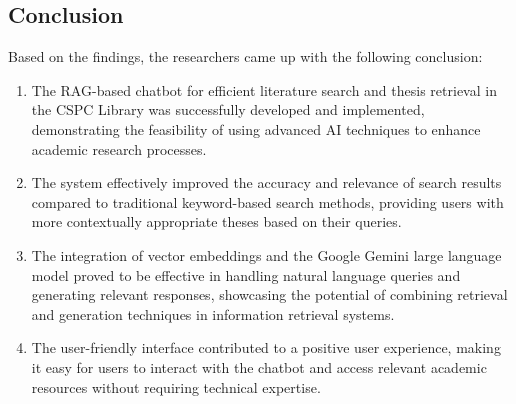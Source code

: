 \begin{refsection}
\section{Conclusion}
Based on the findings, the researchers came up with the following conclusion:
\begin{enumerate}
    \item The RAG-based chatbot for efficient literature search and thesis retrieval in the CSPC Library was successfully developed and implemented, demonstrating the feasibility of using advanced AI techniques to enhance academic research processes.
    \item The system effectively improved the accuracy and relevance of search results compared to traditional keyword-based search methods, providing users with more contextually appropriate theses based on their queries.
    \item The integration of vector embeddings and the Google Gemini large language model proved to be effective in handling natural language queries and generating relevant responses, showcasing the potential of combining retrieval and generation techniques in information retrieval systems.
    \item The user-friendly interface contributed to a positive user experience, making it easy for users to interact with the chatbot and access relevant academic resources without requiring technical expertise.


\end{enumerate}
\clearpage

\printbibliography[heading=subbibintoc, title={\centering Notes}]
\end{refsection}
